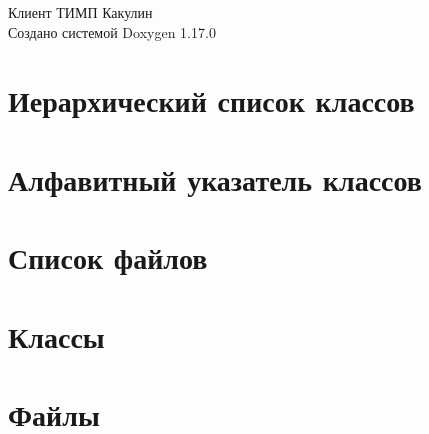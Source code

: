 \documentclass[twoside]{book}
\newcommand{\+}{\discretionary{\mbox{\scriptsize$\hookleftarrow$}}{}{}}
\newcommand{\clearemptydoublepage}{%
    \newpage{\pagestyle{empty}\cleardoublepage}%
  }
\begin{document}
  \raggedbottom
    \hypersetup{pageanchor=false,
                bookmarksnumbered=true,
                pdfencoding=unicode
               }
  \begin{titlepage}
  \vspace*{7cm}
  \begin{center}%
  {\Large Клиент ТИМП Какулин}\\
  \vspace*{1cm}
  {\large Создано системой Doxygen 1.17.0}\\
  \end{center}
  \end{titlepage}
  \clearemptydoublepage
  \tableofcontents
  \clearemptydoublepage
  \hypersetup{pageanchor=true}
\chapter{Иерархический список классов}

\chapter{Алфавитный указатель классов}

\chapter{Список файлов}

\chapter{Классы}










\chapter{Файлы}









  \backmatter
  \newpage
  \clearemptydoublepage
  \printindex
\end{document}
